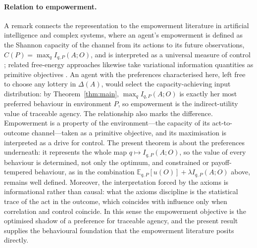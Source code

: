 \documentclass[11pt,a4paper]{article}
\theoremstyle{definition}
\newcommand{\E}{\mathbb E}
\newcommand{\1}{\mathbf 1}
\begin{document}
\paragraph{Relation to empowerment.}
A remark connects the representation to the empowerment literature in artificial intelligence and complex systems,
where an agent's empowerment is defined as the Shannon capacity of the channel from its actions to its future
observations, $C(P)=\max_{q}I_{q,P}(A;O)$, and is interpreted as a universal measure of control
\cite{KlyubinPolaniNehaniv2005,SalgeGlackinPolani2014}; related free-energy approaches likewise take variational
information quantities as primitive objectives \cite{Friston2010}.  An agent with the preferences characterised here,
left free to choose any lottery in $\Delta(A)$, would select the capacity-achieving input distribution: by
Theorem~\ref{thm:main}, $\max_{q}I_{q,P}(A;O)$ is exactly her most preferred behaviour in environment $P$, so
empowerment is the indirect-utility value of traceable agency.  The relationship also marks the difference.
Empowerment is a property of the environment---the capacity of its act-to-outcome channel---taken as a primitive
objective, and its maximisation is interpreted as a drive for control.  The present theorem is about the preferences
underneath: it represents the whole map $q\mapsto I_{q,P}(A;O)$, so the value of every behaviour is determined, not
only the optimum, and constrained or payoff-tempered behaviour, as in the combination
$\E_{q,P}[u(O)]+\lambda I_{q,P}(A;O)$ above, remains well defined.  Moreover, the interpretation forced by the axioms
is informational rather than causal: what the axioms discipline is the statistical trace of the act in the outcome,
which coincides with influence only when correlation and control coincide.  In this sense the empowerment objective is
the optimised shadow of a preference for traceable agency, and the present result supplies the behavioural foundation
that the empowerment literature posits directly.
\end{document}
